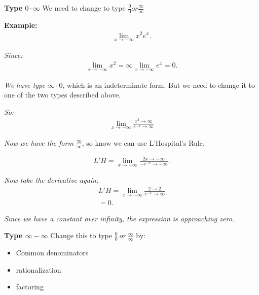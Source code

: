 \documentclass{report}
\begin{document}
  \bigbreak \noindent 

  \bigbreak \noindent 
  \begin{mdframed}
    \textbf{Type $0 \cdot \infty $}
    \bigbreak \noindent 
    We need to change to type $\frac{0}{0} or \frac{\infty}{\infty}$
  \end{mdframed}

  \bigbreak \noindent 
  \begin{mdframed}
    \textbf{Example:}
    \begin{align*}
      \lim_{x \to -\infty}{x^{2}e^{x}}
    .\end{align*}
  \end{mdframed}

  \bigbreak \noindent 
  \textit{Since:}
  \begin{align*}
    \lim_{x \to -\infty}{x^{2}} = \infty 
    \lim_{x \to -\infty}{e^{x}} = 0
  .\end{align*}

  \bigbreak \noindent 
  \textit{We have type $\infty \cdot 0 $}, which is an indeterminate form. But we need 
  to change it to one of the two types described above.

  \bigbreak \noindent
  \textit{So:}
  \begin{align*}
    \lim_{x \to -\infty}{\frac{x^{2} \rightarrow \infty}{e^{-x} \rightarrow \infty}}
  \end{align*}

  \bigbreak \noindent 
  \textit{Now we have the form $\frac{\infty}{\infty}$}, so know we can use L'Hospital's Rule.

  \begin{align*}
    L'H = \lim_{x \to -\infty}{\frac{2x \rightarrow -\infty}{-e^{-x} \rightarrow -\infty}}
  .\end{align*}

  \bigbreak \noindent 
  \textit{Now take the derivative again:}
  \begin{align*}
    L'H = \lim_{x \to -\infty}{\frac{2 \rightarrow 2}{e^{-x} \rightarrow \infty}} \\
    \boxed{= 0}
  .\end{align*}

  \bigbreak \noindent 
  \textit{Since we have a constant over infinity, the expression is approaching zero.}

  \bigbreak \noindent 
  \begin{mdframed}
    \textbf{Type $\infty - \infty$}
    \bigbreak \noindent 
    Change this to type $\frac{0}{0}\ or\ \frac{\infty}{\infty}$ by:
    \begin{itemize}
      \item Common denominators
      \item rationalization
      \item factoring
    \end{itemize}
  \end{mdframed}
\end{document}
